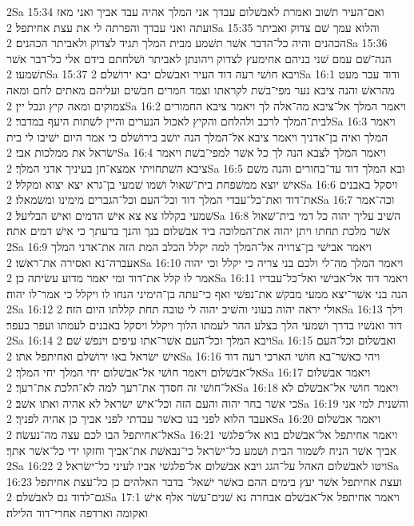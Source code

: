 2Sa 15:34  ואם־העיר תשׁוב ואמרת לאבשׁלום עבדך אני המלך אהיה עבד אביך ואני מאז ועתה ואני עבדך והפרתה לי את עצת אחיתפל׃
2Sa 15:35  והלוא עמך שׁם צדוק ואביתר הכהנים והיה כל־הדבר אשׁר תשׁמע מבית המלך תגיד לצדוק ולאביתר הכהנים׃
2Sa 15:36  הנה־שׁם עמם שׁני בניהם אחימעץ לצדוק ויהונתן לאביתר ושׁלחתם בידם אלי כל־דבר אשׁר תשׁמעו׃
2Sa 15:37  ויבא חושׁי רעה דוד העיר ואבשׁלם יבא ירושׁלם׃
2Sa 16:1  ודוד עבר מעט מהראשׁ והנה ציבא נער מפי־בשׁת לקראתו וצמד חמרים חבשׁים ועליהם מאתים לחם ומאה צמוקים ומאה קיץ ונבל יין׃
2Sa 16:2  ויאמר המלך אל־ציבא מה־אלה לך ויאמר ציבא החמורים לבית־המלך לרכב ולהלחם והקיץ לאכול הנערים והיין לשׁתות היעף במדבר׃
2Sa 16:3  ויאמר המלך ואיה בן־אדניך ויאמר ציבא אל־המלך הנה יושׁב בירושׁלם כי אמר היום ישׁיבו לי בית ישׂראל את ממלכות אבי׃
2Sa 16:4  ויאמר המלך לצבא הנה לך כל אשׁר למפי־בשׁת ויאמר ציבא השׁתחויתי אמצא־חן בעיניך אדני המלך׃
2Sa 16:5  ובא המלך דוד עד־בחורים והנה משׁם אישׁ יוצא ממשׁפחת בית־שׁאול ושׁמו שׁמעי בן־גרא יצא יצוא ומקלל׃
2Sa 16:6  ויסקל באבנים את־דוד ואת־כל־עבדי המלך דוד וכל־העם וכל־הגברים מימינו ומשׂמאלו׃
2Sa 16:7  וכה־אמר שׁמעי בקללו צא צא אישׁ הדמים ואישׁ הבליעל׃
2Sa 16:8  השׁיב עליך יהוה כל דמי בית־שׁאול אשׁר מלכת תחתו ויתן יהוה את־המלוכה ביד אבשׁלום בנך והנך ברעתך כי אישׁ דמים אתה׃
2Sa 16:9  ויאמר אבישׁי בן־צרויה אל־המלך למה יקלל הכלב המת הזה את־אדני המלך אעברה־נא ואסירה את־ראשׁו׃
2Sa 16:10  ויאמר המלך מה־לי ולכם בני צריה כי יקלל וכי יהוה אמר לו קלל את־דוד ומי יאמר מדוע עשׂיתה כן׃
2Sa 16:11  ויאמר דוד אל־אבישׁי ואל־כל־עבדיו הנה בני אשׁר־יצא ממעי מבקשׁ את־נפשׁי ואף כי־עתה בן־הימיני הנחו לו ויקלל כי אמר־לו יהוה׃
2Sa 16:12  אולי יראה יהוה בעוני והשׁיב יהוה לי טובה תחת קללתו היום הזה׃
2Sa 16:13  וילך דוד ואנשׁיו בדרך ושׁמעי הלך בצלע ההר לעמתו הלוך ויקלל ויסקל באבנים לעמתו ועפר בעפר׃
2Sa 16:14  ויבא המלך וכל־העם אשׁר־אתו עיפים וינפשׁ שׁם׃
2Sa 16:15  ואבשׁלום וכל־העם אישׁ ישׂראל באו ירושׁלם ואחיתפל אתו׃
2Sa 16:16  ויהי כאשׁר־בא חושׁי הארכי רעה דוד אל־אבשׁלום ויאמר חושׁי אל־אבשׁלום יחי המלך יחי המלך׃
2Sa 16:17  ויאמר אבשׁלום אל־חושׁי זה חסדך את־רעך למה לא־הלכת את־רעך׃
2Sa 16:18  ויאמר חושׁי אל־אבשׁלם לא כי אשׁר בחר יהוה והעם הזה וכל־אישׁ ישׂראל לא אהיה ואתו אשׁב׃
2Sa 16:19  והשׁנית למי אני אעבד הלוא לפני בנו כאשׁר עבדתי לפני אביך כן אהיה לפניך׃
2Sa 16:20  ויאמר אבשׁלום אל־אחיתפל הבו לכם עצה מה־נעשׂה׃
2Sa 16:21  ויאמר אחיתפל אל־אבשׁלם בוא אל־פלגשׁי אביך אשׁר הניח לשׁמור הבית ושׁמע כל־ישׂראל כי־נבאשׁת את־אביך וחזקו ידי כל־אשׁר אתך׃
2Sa 16:22  ויטו לאבשׁלום האהל על־הגג ויבא אבשׁלום אל־פלגשׁי אביו לעיני כל־ישׂראל׃
2Sa 16:23  ועצת אחיתפל אשׁר יעץ בימים ההם כאשׁר ישׁאל־ בדבר האלהים כן כל־עצת אחיתפל גם־לדוד גם לאבשׁלם׃
2Sa 17:1  ויאמר אחיתפל אל־אבשׁלם אבחרה נא שׁנים־עשׂר אלף אישׁ ואקומה וארדפה אחרי־דוד הלילה׃
